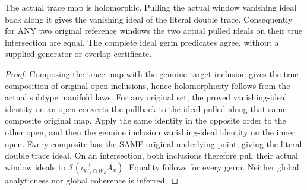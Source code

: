 \begin{lemma}
\label{hir:original-full-reference-true-window-overlap-ideal-equality}
\leanok
{}
The actual trace map is holomorphic. Pulling the actual window vanishing ideal
back along it gives the vanishing ideal of the literal double trace.
Consequently for ANY two original reference windows the two actual pulled
ideals on their true intersection are equal. The complete ideal germ
predicates agree, without a supplied generator or overlap certificate.
\end{lemma}
\begin{proof}
Composing the trace map with the genuine target inclusion gives the true
composition of original open inclusions, hence holomorphicity follows from
the actual subtype manifold laws. For any original set, the proved
vanishing-ideal identity on an open converts the pullback to the ideal pulled
along that same composite original map. Apply the same identity in the
opposite order to the other open, and then the genuine inclusion
vanishing-ideal identity on the inner open. Every composite has the SAME
original underlying point, giving the literal double trace ideal. On an
intersection, both inclusions therefore pull their actual window ideals to
$\mathcal I(\iota_{W_1\cap W_2}^{-1}A_x)$. Equality follows for every germ.
Neither global analyticness nor global coherence is inferred.
\end{proof}

